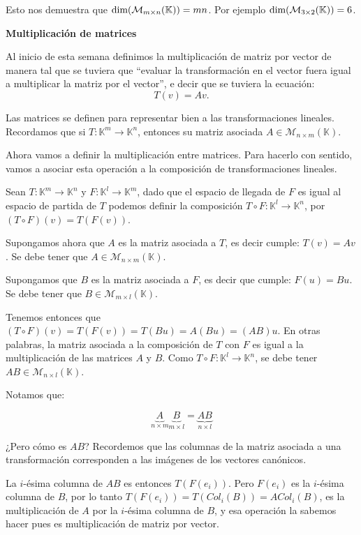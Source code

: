 \documentclass[12pt]{book}
\def\pq{\vspace{0.5cm}}
\def\K{\mathbb{K}}
\def\M{\mathcal{M}}
\def\dim{\textup{dim}}
\begin{document}
Esto nos demuestra que $\dim(\mathcal{M}_{m\times n}(\K))=mn$.
Por ejemplo  $\dim(\mathcal{M}_{3\times 2}(\K))=6$.

\pq

\begin{center}
{\large \bf{ Multiplicación de matrices}}
\end{center}

\pq

Al inicio de esta semana definimos la multiplicación de matriz por vector de manera tal que se tuviera que ``evaluar la transformación en el vector fuera igual a multiplicar la matriz por el vector'', e decir que se tuviera la ecuación:
$$ T(v)=Av.$$

Las matrices se definen para representar bien a las transformaciones lineales.
Recordamos que si $T:\K^m\rightarrow \K^n$, entonces su matriz asociada $A\in\M_{n\times m}(\K)$.

Ahora vamos a definir la multiplicación entre matrices. Para hacerlo con sentido, vamos a asociar esta operación a la composición de transformaciones lineales.

Sean $T:\K^m\rightarrow \K^n$ y $F:\K^l\rightarrow \K^m$, dado que el espacio de llegada de $F$ es igual al espacio de partida de $T$ podemos definir la composición $T\circ F:\K^l\rightarrow \K^n$, por $(T\circ F)(v)=T(F(v))$.

Supongamos ahora que $A$ es la matriz asociada a $T$, es decir cumple: $T(v)=Av$.
Se debe tener que $A\in\M_{n\times m}(\K)$.

Supongamos que $B$ es la matriz asociada a $F$, es decir que cumple: $F(u)=Bu$.
Se debe tener que $B\in\M_{m\times l}(\K)$.

Tenemos entonces que $(T\circ F)(v)=T(F(v))=T(Bu)=A(Bu)=(AB)u$.
En otras palabras, la matriz asociada a la composición de $T$ con $F$ es igual a la multiplicación de las matrices $A$ y $B$.
Como $T\circ F:\K^l\rightarrow \K^n$, se debe tener $AB\in\M_{n\times l}(\K)$.

Notamos que:

$$ \underbrace{A}_{n\times m} \underbrace{B}_{m\times l} = \underbrace{AB}_{n\times l} $$

¿Pero cómo es $AB$? Recordemos que las columnas de la matriz asociada a una transformación corresponden a las imágenes de los vectores canónicos.

La $i$-ésima columna de $AB$ es entonces $T(F(e_i))$.
Pero $F(e_i)$ es la $i$-ésima columna de $B$, por lo tanto $T(F(e_i))=T(Col_i(B))=ACol_i(B)$, es la multiplicación de $A$ por la $i$-ésima columna de $B$, y esa operación la sabemos hacer pues es multiplicación de matriz por vector.
\end{document}
